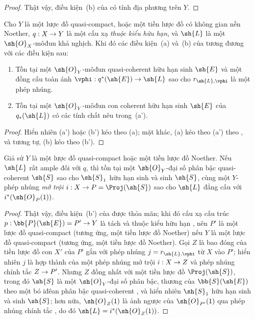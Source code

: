 \documentclass[oneside,10pt]{amsart}
\makeatletter
\newcommand{\ega@arrow}[2]{\mathchoice{#1}{#2}{#2}{#2}}
\renewcommand{\to}{\ega@arrow{\longrightarrow}{\rightarrow}}
\let\EGAOriginalLabel\label
\renewcommand{\label}[1]{\phantomsection\EGAOriginalLabel{#1}}
\makeatother
\begin{document}
\begin{proof}
Thật vậy, điều kiện~(b) của  có tính địa phương trên $Y$.
\end{proof}

\begin{proposition}[4.4.6]
\label{II.4.4.6}
Cho $Y$ là một lược đồ quasi-compact, hoặc một tiền lược đồ có không gian nền Noether, $q:X\to Y$ là một cấu xạ \emph{thuộc kiểu hữu hạn}, và $\sh{L}$ là một $\sh{O}_X$-môđun khả nghịch.
Khi đó các điều kiện~(a) và~(b) của  tương đương với các điều kiện sau:
\begin{enumerate}
  \item[\rm{(a')}] Tồn tại một $\sh{O}_Y$-môđun quasi-coherent hữu hạn sinh $\sh{E}$ và một đồng cấu toàn ánh $\vphi:q^*(\sh{E})\to\sh{L}$ sao cho $r_{\sh{L},\vphi}$ là một phép nhúng.
  \item[\rm{(b')}] Tồn tại một $\sh{O}_Y$-môđun con coherent hữu hạn sinh $\sh{E}$ của $q_*(\sh{L})$ có các tính chất nêu trong~(a').
\end{enumerate}
\end{proposition}

\begin{proof}
Hiển nhiên (a') hoặc (b') kéo theo (a);
mặt khác, (a) kéo theo (a') theo , và tương tự, (b) kéo theo (b').
\end{proof}

\begin{corollary}[4.4.7]
\label{II.4.4.7}
Giả sử $Y$ là một lược đồ quasi-compact hoặc một tiền lược đồ Noether.
Nếu $\sh{L}$ rất ample đối với $q$, thì tồn tại một $\sh{O}_Y$-đại số phân bậc quasi-coherent $\sh{S}$ sao cho $\sh{S}_1$ hữu hạn sinh và sinh $\sh{S}$, cùng một $Y$-phép nhúng \emph{mở trội} $i:X\to P=\Proj(\sh{S})$ sao cho $\sh{L}$ đẳng cấu với $i^*(\sh{O}_P(1))$.
\end{corollary}

\begin{proof}
Thật vậy, điều kiện~(b') của  được thỏa mãn;
khi đó cấu xạ cấu trúc $p:\bb{P}(\sh{E})=P'\to Y$ là tách và thuộc kiểu hữu hạn , nên $P'$ là một lược đồ quasi-compact (tương ứng, một tiền lược đồ Noether) nếu $Y$ là một lược đồ quasi-compact (tương ứng, một tiền lược đồ Noether).
Gọi $Z$ là bao đóng  của tiền lược đồ con $X'$ của $P'$ gắn với phép nhúng $j=r_{\sh{L},\vphi}$ từ $X$ vào $P'$;
hiển nhiên $j$ là hợp thành của một phép nhúng mở trội $i:X\to Z$ và phép nhúng chính tắc $Z\to P'$.
Nhưng $Z$ đồng nhất với một tiền lược đồ $\Proj(\sh{S})$, trong đó $\sh{S}$ là một $\sh{O}_Y$-đại số phân bậc, thương của $\bb{S}(\sh{E})$ theo một bó iđêan phân bậc quasi-coherent , và hiển nhiên $\sh{S}_1$ hữu hạn sinh và sinh $\sh{S}$;
hơn nữa, $\sh{O}_Z(1)$ là ảnh ngược của $\sh{O}_{P'}(1)$ qua phép nhúng chính tắc , do đó $\sh{L}=i^*(\sh{O}_Z(1))$.
\end{proof}
\end{document}
